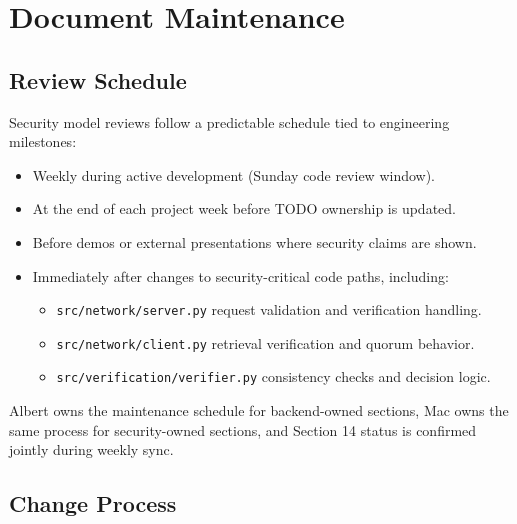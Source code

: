 \documentclass[../veristore_security_model.tex]{subfiles}
\begin{document}
\section{Document Maintenance}


\subsection{Review Schedule}

Security model reviews follow a predictable schedule tied to engineering milestones:
\begin{itemize}
    \item Weekly during active development (Sunday code review window).
    \item At the end of each project week before TODO ownership is updated.
    \item Before demos or external presentations where security claims are shown.
    \item Immediately after changes to security-critical code paths, including:
    \begin{itemize}
        \item \texttt{src/network/server.py} request validation and verification handling.
        \item \texttt{src/network/client.py} retrieval verification and quorum behavior.
        \item \texttt{src/verification/verifier.py} consistency checks and decision logic.
    \end{itemize}
\end{itemize}

Albert owns the maintenance schedule for backend-owned sections, Mac owns the same process for security-owned sections, and Section 14 status is confirmed jointly during weekly sync.

\subsection{Change Process}
\end{document}
